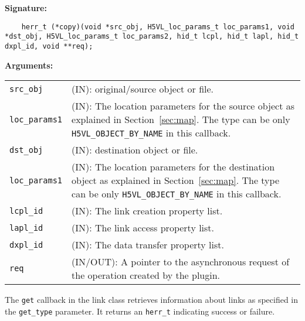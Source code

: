 \begin{mdframed}[style=bgbox]
\textbf{Signature:}
\begin{lstlisting}
    herr_t (*copy)(void *src_obj, H5VL_loc_params_t loc_params1, void *dst_obj, H5VL_loc_params_t loc_params2, hid_t lcpl, hid_t lapl, hid_t dxpl_id, void **req);
\end{lstlisting}

\textbf{Arguments:}\\
\begin{tabular}{l p{13.5cm}}
  \texttt{src\_obj} & (IN): original/source object or file. \\
  \texttt{loc\_params1} & (IN): The location parameters for the source
  object as explained in Section~\ref{sec:map}. The type can be only \texttt{H5VL\_OBJECT\_BY\_NAME} in this callback. \\
  \texttt{dst\_obj} & (IN): destination object or file. \\
  \texttt{loc\_params1} & (IN): The location parameters for the destination
  object as explained in Section~\ref{sec:map}. The type can be only \texttt{H5VL\_OBJECT\_BY\_NAME} in this callback. \\
  \texttt{lcpl\_id} & (IN): The link creation property list.\\
  \texttt{lapl\_id} & (IN): The link access property list.\\
  \texttt{dxpl\_id} & (IN): The data transfer property list.\\
  \texttt{req} & (IN/OUT): A pointer to the asynchronous request of the
  operation created by the plugin.\\
\end{tabular}
\end{mdframed}

The \texttt{get} callback in the link class retrieves information
about links as specified in the \texttt{get\_type} parameter. It
returns an \texttt{herr\_t} indicating success or failure.\bigskip

